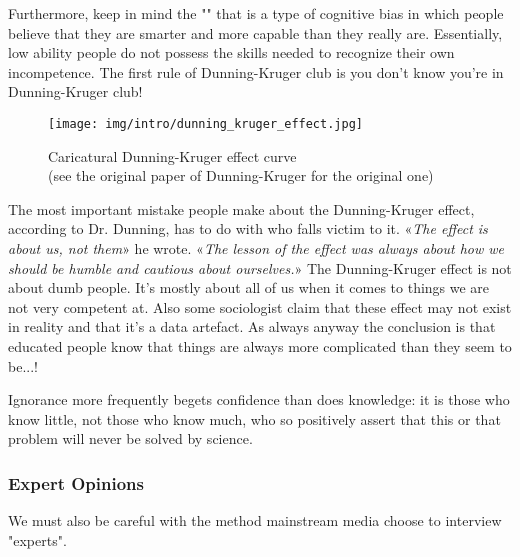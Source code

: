 	Furthermore, keep in mind the "\label{Dunning-Kruger effect}" that is a type of cognitive bias in which people believe that they are smarter and more capable than they really are. Essentially, low ability people do not possess the skills needed to recognize their own incompetence. The first rule of Dunning-Kruger club is you don't know you're in Dunning-Kruger club!
	\begin{figure}[H]
		\centering
		\texttt{[image: img/intro/dunning\_kruger\_effect.jpg]}
		\caption[Caricatural Dunning-Kruger effect curve]{Caricatural Dunning-Kruger effect curve\\ (see the original paper of Dunning-Kruger for the original one)}
	\end{figure} 
	\begin{tcolorbox}[title=Remark,arc=10pt,breakable,drop lifted shadow,
  skin=enhanced,
  skin first is subskin of={enhancedfirst}{arc=10pt,no shadow},
  skin middle is subskin of={enhancedmiddle}{arc=10pt,no shadow},
  skin last is subskin of={enhancedlast}{drop lifted shadow}]
	The most important mistake people make about the Dunning-Kruger effect, according to Dr. Dunning, has to do with who falls victim to it. «\textit{The effect is about us, not them}» he wrote. «\textit{The lesson of the effect was always about how we should be humble and cautious about ourselves.}» The Dunning-Kruger effect is not about dumb people. It's mostly about all of us when it comes to things we are not very competent at. Also some sociologist claim that these effect may not exist in reality and that it's a data artefact. As always anyway the conclusion is that educated people know that things are always more complicated than they seem to be...!
	\end{tcolorbox}
	
	\begin{fquote}Ignorance more frequently begets confidence than does knowledge: it is those who know little, not those who know much, who so positively assert that this or that problem will never be solved by science.
 	\end{fquote}
	
	\pagebreak
	\subsubsection{Expert Opinions}
	We must also be careful with the method mainstream media choose to interview "experts". 
	
